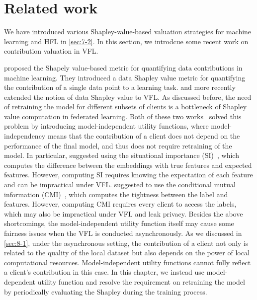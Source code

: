 \section{Related work} \label{sec:8-2}

We have introduced various Shapley-value-based valuation strategies for machine learning and HFL in \autoref{sec:7-2}. In this section, we introdcue some recent work on contribution valuation in VFL. 

\citet{ghorbani2019data} proposed the Shapely value-based metric for quantifying data contributions in machine learning. They introduced a data Shapley value metric for quantifying the contribution of a single data point to a learning task. \citet{wang2019measure} and more recently \citet{han2021data} extended the notion of data Shapley value to VFL. As discussed before, the need of retraining the model for different subsets of clients is a bottleneck of Shapley value computation in federated learning. Both of these two works~\citep{wang2019measure,han2021data} solved this problem by introducing model-independent utility functions, where model-independency means that the contribution of a client does not depend on the performance of the final model, and thus does not require retraining of the model. In particular, \citet{wang2019measure} suggested using the situational importance (SI)~\citep{achen1982interpreting}, which computes the difference between the embeddings with true features and expected features. However, computing SI requires knowing the expectation of each feature and can be impractical under VFL. \citet{han2021data} suggested to use the conditional mutual information (CMI)~\citep{brown2012conditional}, which computes the tightness between the label and features. However, computing CMI requires every client to access the labels, which may also be impractical under VFL and leak privacy. Besides the above shortcomings, the model-independent utility function itself may cause some fairness issues when the VFL is conducted asynchronously. As we discussed in \autoref{sec:8-1}, under the asynchronous setting, the contribution of a client not only is related to the quality of the local dataset but also depends on the power of local computational resources. Model-independent utility functions cannot fully reflect a client's contribution in this case. In this chapter, we instead use model-dependent utility function and resolve the requirement on retraining the model by periodically evaluating the Shapley during the training process.


